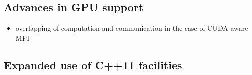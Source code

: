 \documentclass{ansarticle-preprint}
\begin{document}


\subsection{Advances in GPU support}
\label{subsec:gpu}

\begin{itemize}
\item overlapping of computation and communication in the case of CUDA-aware MPI
\end{itemize}


\subsection{Expanded use of C++11 facilities}
\label{subsec:cxx}


\end{document}
